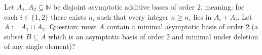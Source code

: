 Let $A_1,A_2\subseteq\mathbb{N}$ be disjoint asymptotic additive bases of order $2$, meaning:
for each $i\in\{1,2\}$ there exists $n_i$ such that every integer $n\ge n_i$ lies in $A_i+A_i$.
Let $A:=A_1\cup A_2$.
Question: must $A$ contain a minimal asymptotic basis of order $2$ (a subset $B\subseteq A$ which is an asymptotic basis of order $2$ and minimal under deletion of any single element)?
